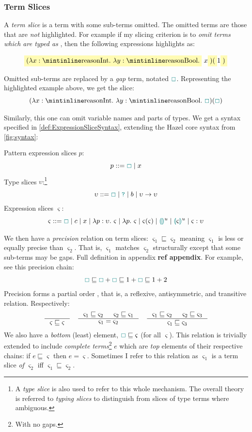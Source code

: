 \subsubsection{Term Slices}
A \textit{term slice} is a term with some sub-terms omitted. The omitted terms are those that are \textit{not} highlighted. For example if my slicing criterion is to \textit{omit terms which are typed as} , then the following expressions highlights as:

\[\hlcmaths[yellow!30]{(\lambda x: \code{Int}.\ \lambda y : \code{Bool}.}\ x\hlcmaths[yellow!30]{)(}1\hlcmaths[yellow!30]{)}\]


Omitted sub-terms are replaced by a \textit{gap} term, notated $\gap$. Representing the highlighted example above, we get the slice:
\[(\lambda x : \code{Int}.\ \lambda y : \code{Bool}.\ \gap)(\gap)\]

Similarly, this one can omit variable names and parts of types. We get a syntax specified in \cref{def:ExpressionSliceSyntax}, extending the Hazel core syntax from \cref{fig:syntax}: 
\begin{definition}
\label{def:ExpressionSliceSyntax}
Pattern expression slices $p$:
\[p ::= \gap \mid x\]
Type slices $\upsilon$:\footnote{A \textit{type slice} is also used to refer to this whole mechanism. The overall theory is referred to \textit{typing slices} to distinguish from slices of type terms where ambiguous.}
\[\upsilon ::= \gap \mid \dyn \mid b \mid \upsilon \to \upsilon\]
Expression slices $\varsigma$:
\[\varsigma ::= \gap \mid  c \mid x \mid \lambda p : \upsilon.\ \varsigma \mid \lambda p.\ \varsigma \mid \varsigma(\varsigma) \mid \hole^u \mid \hole[\varsigma]^u \mid \varsigma : \upsilon\]
\end{definition}

We then have a \textit{precision} relation on term slices: $\varsigma_1 \sqsubseteq \varsigma_2$ meaning $\varsigma_1$ is less or equally precise than $\varsigma_2$. That is, $\varsigma_1$ matches $\varsigma_2$ structurally except that some sub-terms may be gaps. Full definition in appendix \textbf{ref appendix}. For example, see this precision chain:
\[\gap \sqsubseteq\gap + \gap\sqsubseteq 1 + \gap \sqsubseteq 1 + 2\]
Precision forms a partial order \cite{PartialOrder}, that is, a reflexive, antisymmetric, and transitive relation. Respectively:
\[\inference{}{\varsigma \sqsubseteq \varsigma} \quad \inference{\varsigma_1 \sqsubseteq \varsigma_2 & \varsigma_2 \sqsubseteq \varsigma_1}{\varsigma_1 = \varsigma_2} \quad \inference{\varsigma_1 \sqsubseteq \varsigma_2 & \varsigma_2 \sqsubseteq \varsigma_3}{\varsigma_1 \sqsubseteq \varsigma_3}\]
We also have a \textit{bottom} (least) element, $\gap \sqsubseteq \varsigma$ (for all $\varsigma$). This relation is trivially extended to include \textit{complete terms}\footnote{With no gaps.} $e$ which are \textit{top} elements of their respective chains: if $e \sqsubseteq \varsigma$ then $e = \varsigma$. Sometimes I refer to this relation as $\varsigma_1$ is a term slice \textit{of} $\varsigma_2$ iff $\varsigma_1 \sqsubseteq \varsigma_2$.


